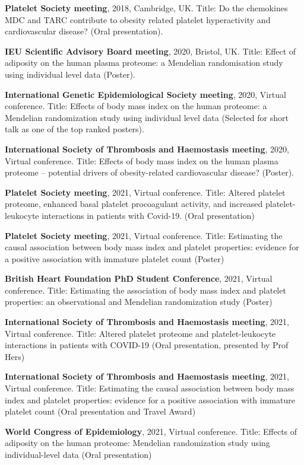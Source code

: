 \documentclass[11pt,twoside]{bristolthesis}
\begin{document}
\textbf{Platelet Society meeting}, 2018, Cambridge, UK. Title: Do the chemokines MDC and TARC contribute to obesity related platelet hyperactivity and cardiovascular disease? (Oral presentation).

\textbf{IEU Scientific Advisory Board meeting}, 2020, Bristol, UK. Title: Effect of adiposity on the human plasma proteome: a Mendelian randomisation study using individual level data (Poster).

\textbf{International Genetic Epidemiological Society meeting}, 2020, Virtual conference. Title: Effects of body mass index on the human proteome: a Mendelian randomization study using individual level data (Selected for short talk as one of the top ranked posters).

\textbf{International Society of Thrombosis and Haemostasis meeting}, 2020, Virtual conference. Title: Effects of body mass index on the human plasma proteome -- potential drivers of obesity-related cardiovascular disease? (Poster).

\textbf{Platelet Society meeting}, 2021, Virtual conference. Title: Altered platelet proteome, enhanced basal platelet procoagulant activity, and increased platelet-leukocyte interactions in patients with Covid-19. (Oral presentation)

\textbf{Platelet Society meeting}, 2021, Virtual conference. Title: Estimating the causal association between body mass index and platelet properties: evidence for a positive association with immature platelet count (Poster)

\textbf{British Heart Foundation PhD Student Conference}, 2021, Virtual conference. Title: Estimating the association of body mass index and platelet properties: an observational and Mendelian randomization study (Poster)

\textbf{International Society of Thrombosis and Haemostasis meeting}, 2021, Virtual conference. Title: Altered platelet proteome and platelet-leukocyte interactions in patients with COVID-19 (Oral presentation, presented by Prof Hers)

\textbf{International Society of Thrombosis and Haemostasis meeting}, 2021, Virtual conference. Title: Estimating the causal association between body mass index and platelet properties: evidence for a positive association with immature platelet count (Oral presentation and Travel Award)

\textbf{World Congress of Epidemiology}, 2021, Virtual conference. Title: Effects of adiposity on the human proteome: Mendelian randomization study using individual-level data (Oral presentation)
\end{document}
